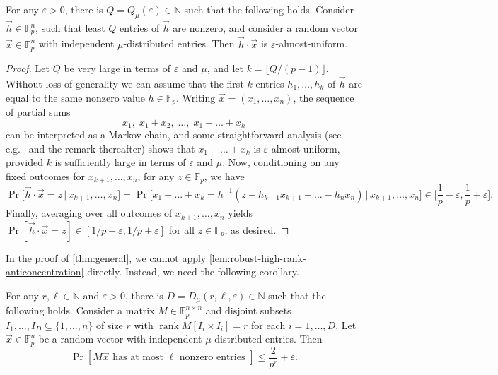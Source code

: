 \documentclass[10pt,reqno]{amsart}
\numberwithin{equation}{section}
\theoremstyle{remark}
\newcommand{\mb}{\mathbb}
\newcommand{\on}{\operatorname}
\newcommand{\eps}{\varepsilon}
\begin{document}
\begin{lemma}\label{lem:approx-unif}
    For any $\varepsilon>0$, there is $Q=Q_\mu(\varepsilon)\in \mb N$ such that the following holds. Consider $\vec h\in \mb F_p^n$, such that least $Q$ entries of $\vec h$ are nonzero, and consider a random vector $\vec x\in \mb F_p^n$
with independent $\mu$-distributed entries. Then $\vec h\cdot \vec x$ is $\varepsilon$-almost-uniform.
\end{lemma}
\begin{proof}
Let $Q$ be very large in terms of $\varepsilon$ and $\mu$, and let $k=\lfloor Q/(p-1)\rfloor$. Without loss of generality we can assume that the first $k$ entries $h_1,\dots,h_{k}$ of $\vec h$ are equal to the same nonzero value $h\in \mb F_p$. Writing $\vec x=(x_1,\dots,x_n)$, the sequence of partial sums
\[x_1,\;x_1+x_2,\;\dots,\; x_1+\dots+x_{k}\] can be interpreted as a Markov chain, and some straightforward analysis (see e.g.\ \cite[Lemma~5.1]{KK01} and the remark thereafter) shows that $x_1+\dots+x_{k}$ is $\varepsilon$-almost-uniform, provided $k$ is sufficiently large in terms of $\varepsilon$ and $\mu$. 
Now, conditioning on any fixed outcomes for $x_{k+1},\dots,x_n$, for any $z\in \mb F_p$, we have 
\[\Pr\!\big[\vec h\cdot \vec x=z\,\big|\,x_{k+1},\dots,x_n\big]=\Pr\!\big[x_1+\dots+x_k=h^{-1}(z-h_{k+1}x_{k+1}-\dots-h_nx_n)\,\big|\,x_{k+1},\dots,x_n\big]\in \Bigg[\frac{1}{p}-\eps,\frac{1}{p}+\eps\Bigg].\]
Finally, averaging over all outcomes of $x_{k+1},\dots,x_n$ yields $\Pr[\vec h\cdot \vec x=z]\in [1/p-\eps,1/p+\eps]$ for all $z\in \mb F_p$, as desired.
\end{proof}

In the proof of \cref{thm:general}, we cannot apply \cref{lem:robust-high-rank-anticoncentration} directly. Instead, we need the following corollary.

\begin{corollary}\label{coro:robust-high-rank-hamming-anticoncentration}
    For any $r,\ell\in \mb N$ and $\varepsilon>0$, there is $D=D_\mu(r,\ell,\varepsilon)\in \mb N$ such that the following holds. Consider a matrix $M\in \mb F_p^{n\times n}$ and disjoint subsets $I_1,\dots,I_{D}\subseteq\{1,\dots,n\}$ of size $r$ with $\on{rank} M[I_i\times I_i]=r$ for each $i=1,\dots,D$. Let $\vec x\in \mb F_p^n$ be a random vector 
with independent $\mu$-distributed entries. Then
\[\Pr[ M\vec{x} \text{ has at most }\ell\text{ nonzero entries }]\le \frac 2{p^r}+\varepsilon.\]
\end{corollary}
\end{document}
